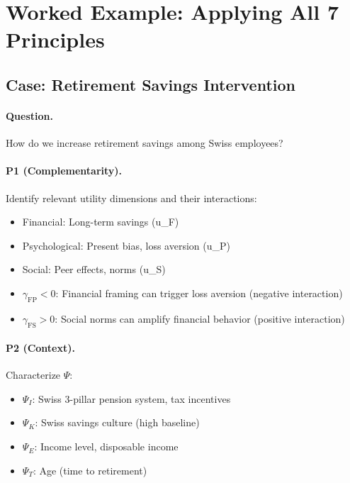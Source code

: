 \section{Worked Example: Applying All 7 Principles}
\label{sec:pr-example}

\subsection{Case: Retirement Savings Intervention}

\paragraph{Question.} How do we increase retirement savings among Swiss employees?

\paragraph{P1 (Complementarity).} Identify relevant utility dimensions and their interactions:
\begin{itemize}[nosep]
    \item Financial: Long-term savings (u_F)
    \item Psychological: Present bias, loss aversion (u_P)
    \item Social: Peer effects, norms (u_S)
    \item $\gamma_{\text{FP}} < 0$: Financial framing can trigger loss aversion (negative interaction)
    \item $\gamma_{\text{FS}} > 0$: Social norms can amplify financial behavior (positive interaction)
\end{itemize}

\paragraph{P2 (Context).} Characterize $\Psi$:
\begin{itemize}[nosep]
    \item $\Psi_I$: Swiss 3-pillar pension system, tax incentives
    \item $\Psi_K$: Swiss savings culture (high baseline)
    \item $\Psi_E$: Income level, disposable income
    \item $\Psi_T$: Age (time to retirement)
\end{itemize}

